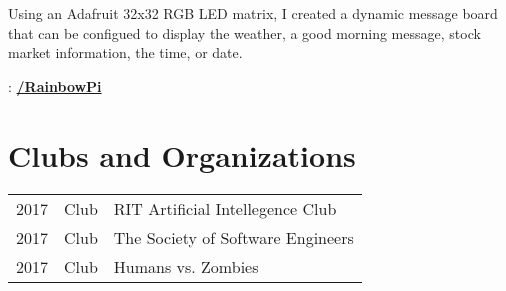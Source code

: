 \documentclass[letterpaper]{deedy-resume} %
\begin{document}
\begin{minipage}[t]{0.66\textwidth}

Using an Adafruit 32x32 RGB LED matrix, I created a dynamic message board that can be configued to display the weather, a good morning message, stock market information, the time, or date. 

\faGithub:  \href{https://github.com/jtkrumlauf/RainbowPi}{\bf /RainbowPi}


\section{Clubs and Organizations} 

\begin{tabular}{rll}
2017 & Club & RIT Artificial Intellegence Club\\
2017 & Club & The Society of Software Engineers\\
2017 & Club & Humans vs. Zombies\\
\end{tabular}

\sectionspace %


\end{minipage} %








\end{document}
